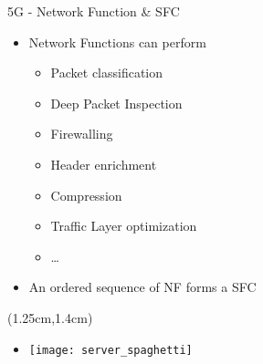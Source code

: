 \begin{frame}{5G - Network Function \& SFC}

  \begin{itemize}
  \item[]<1-> Network Functions can perform
    \begin{itemize}
    \item<2-> Packet classification
    \item<3-> Deep Packet Inspection
    \item<4-> Firewalling
    \item<5-> Header enrichment
    \item<6-> Compression
    \item<7-> Traffic Layer optimization
    \item<8-> \dots
    \end{itemize}
  \item[]<9-> An ordered sequence of NF forms a SFC

  \end{itemize}

  \begin{textblock*}{5cm}(1.25cm,1.4cm)
    \begin{itemize}
      \item[]<10-> \texttt{[image: server\_spaghetti]}
    \end{itemize}
  \end{textblock*}
\end{frame}

